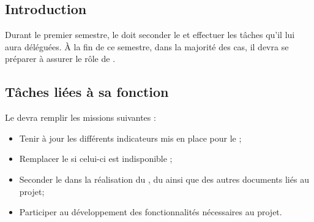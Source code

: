 
\subsection*{Introduction}

Durant le premier semestre, le \RQA{} doit seconder le \RQ{} et effectuer les tâches qu’il lui aura déléguées. À la fin de ce semestre, dans la majorité des cas, il devra se préparer à assurer le rôle de \RQ .

\subsection*{Tâches liées à sa fonction}

Le \RQA{} devra remplir les missions suivantes :
\begin{itemize}
	\item Tenir à jour les différents indicateurs mis en place pour le \PICCourt;
	\item Remplacer le \RQ{} si celui-ci est indisponible ;
	\item Seconder le \RQ{} dans la réalisation du \PQ, du \PGC{} ainsi que des autres documents liés au projet;
        \item Participer au développement des fonctionnalités nécessaires au projet. 
\end{itemize}

